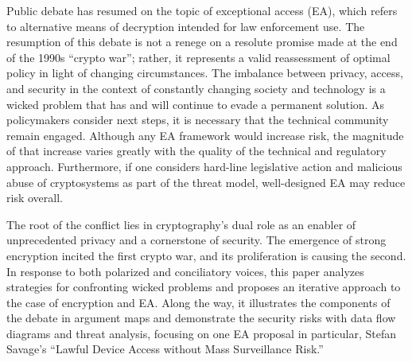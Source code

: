 
Public debate has resumed on the topic of exceptional access (EA), which refers to alternative means of decryption
intended for law enforcement use. The resumption of this debate is not a renege on a resolute promise made at the end of
the 1990s ``crypto war''; rather, it represents a valid reassessment of optimal policy in light of changing
circumstances. The imbalance between privacy, access, and security in the context of constantly changing society and
technology is a wicked problem that has and will continue to evade a permanent solution. As policymakers consider next
steps, it is necessary that the technical community remain engaged. Although any EA framework would increase risk, the
magnitude of that increase varies greatly with the quality of the technical and regulatory approach. Furthermore, if one
considers hard-line legislative action and malicious abuse of cryptosystems as part of the threat model, well-designed
EA may reduce risk overall.

The root of the conflict lies in cryptography's dual role as an enabler of unprecedented privacy and a cornerstone of
security. The emergence of strong encryption incited the first crypto war, and its proliferation is causing the second.
In response to both polarized and conciliatory voices, this paper analyzes strategies for confronting wicked problems
and proposes an iterative approach to the case of encryption and EA. Along the way, it illustrates the components of the
debate in argument maps and demonstrate the security risks with data flow diagrams and threat analysis, focusing on one
EA proposal in particular, Stefan Savage's ``Lawful Device Access without Mass Surveillance Risk.''

